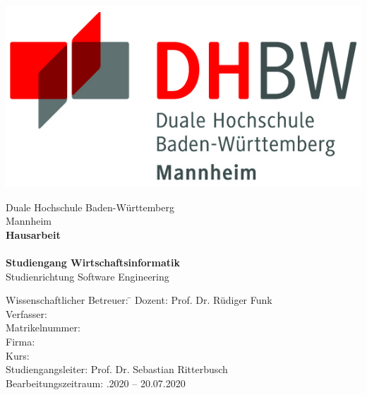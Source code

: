 \begin{titlepage}
    \begin{minipage}{\textwidth}
            \vspace{-2cm}
            \noindent 
            \hfill   \includegraphics{img/logo.jpg}
    \end{minipage}
    \vspace{1em}
    \sffamily
    \begin{center}
        \textsf{\large{}Duale Hochschule Baden-W\"urttemberg\\[1.5mm] Mannheim}\\[2em]
        \textsf{\textbf{\Large{}Hausarbeit}}\\[3mm]
        \textsf{\textbf{\DerTitelDerArbeit}} \\[1.5cm]
        \textsf{\textbf{\Large{}Studiengang Wirtschaftsinformatik}\\[3mm] \textsf{Studienrichtung Software Engineering}}
        
        \vspace{3em}
    \vfill
    
    \begin{minipage}{\textwidth}
    
    \begin{tabbing}
        Wissenschaftlicher Betreuer: \hspace{0.85cm}\=\kill
        Dozent: \> Prof. Dr. Rüdiger Funk \\[1.5mm]
        Verfasser: \> \DerAutorDerArbeit \\[1.5mm]
        Matrikelnummer:  \\[1.5mm]
        Firma: \> \DerNameDerFirma  \\[1.5mm]
        Kurs: \> \DieKursbezeichnung \\[1.5mm]
        Studiengangsleiter: \> Prof. Dr. Sebastian Ritterbusch  \\[1.5mm]
        Bearbeitungszeitraum: .2020 -- 20.07.2020
    \end{tabbing}
    \end{minipage}
    
    \end{center}
    
    \end{titlepage}